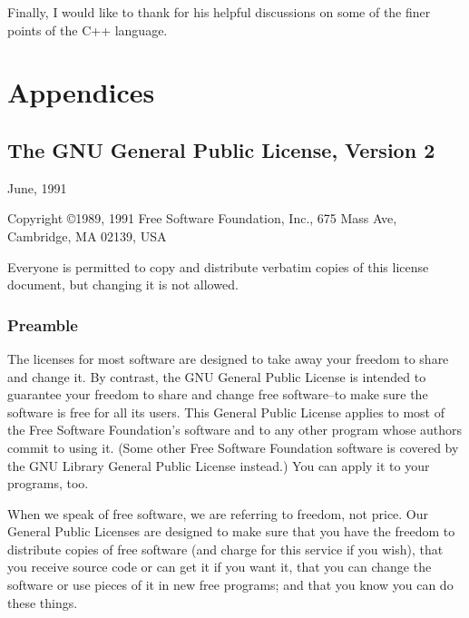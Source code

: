 Finally, I would like to thank 
for his helpful discussions on some of the finer points of the C++
language.




\part{Appendices}

\appendix

\chapter{The GNU General Public License, Version 2}
\label{app:gpl}

\centerline{June, 1991}

\vspace{1 ex}

Copyright \copyright 1989, 1991 Free Software Foundation, Inc.,
675 Mass Ave, Cambridge, MA 02139, USA

\begin{center}
  Everyone is permitted to copy and distribute verbatim copies of this
  license document, but changing it is not allowed.
\end{center}

\section*{Preamble}

  The licenses for most software are designed to take away your
freedom to share and change it.  By contrast, the GNU General Public
License is intended to guarantee your freedom to share and change free
software--to make sure the software is free for all its users.  This
General Public License applies to most of the Free Software
Foundation's software and to any other program whose authors commit to
using it.  (Some other Free Software Foundation software is covered by
the GNU Library General Public License instead.)  You can apply it to
your programs, too.

  When we speak of free software, we are referring to freedom, not
price.  Our General Public Licenses are designed to make sure that you
have the freedom to distribute copies of free software (and charge for
this service if you wish), that you receive source code or can get it
if you want it, that you can change the software or use pieces of it
in new free programs; and that you know you can do these things.

